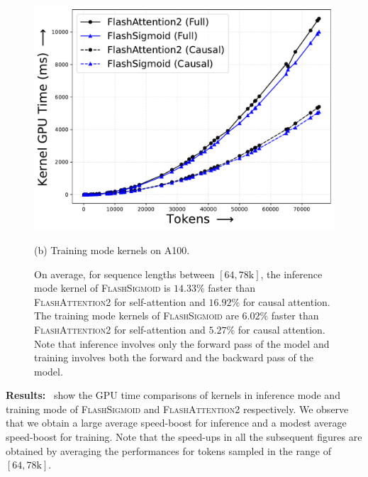 \begin{figure}[!htbp]
\begin{minipage}{0.46\textwidth}
        \includegraphics[trim={0 0 0 0}, width=\textwidth]{figures/_flash_figures/final_arxiv/f2/a100/A100_noalibi_FWDBWD_Full_6.02_0.06_Causal_5.27_0.07.pdf}
        \captionsetup{justification=centering} 
        \caption*{
            (b) Training mode kernels on A100.
        }
    \end{minipage}
    \caption{
        On average, for sequence lengths between $[64, 78\mathrm{k}]$, the inference mode kernel of \textsc{FlashSigmoid} is ${14.33}\%$ faster than \textsc{FlashAttention2} for self-attention and ${16.92}\%$ for causal attention.
        The training mode kernels of \textsc{FlashSigmoid} are ${6.02}\%$ faster than \textsc{FlashAttention2} for self-attention and ${5.27}\%$ for causal attention.
        Note that inference involves only the forward pass of the model and training involves both the forward and the backward pass of the model. 
    }
    \label{fig:a100-softmax-sigmoid-fwd-bwd}
\end{figure}
\vspace{-0.1in}

\noindent\textbf{Results:}\  show the GPU time comparisons of kernels in inference mode and training mode of \textsc{FlashSigmoid} and \textsc{FlashAttention2} respectively.
We observe that we obtain a large average speed-boost for inference and a modest average speed-boost for training. 
Note that the speed-ups in all the subsequent figures are obtained by averaging the performances for tokens sampled in the range of $[64, 78\mathrm{k}]$.

